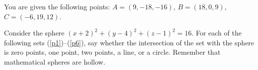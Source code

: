 \documentclass[12pt,addpoints]{exam}
\begin{document}
\begin{questions} 

\question You are given the following points: $A = (9, -18, -16)$, $B = (18, 0, 9)$, $C = (-6, 19, 12)$.




\question Consider the sphere $(x + 2)^2 + (y - 4)^2 + (z - 1)^2 = 16$. For each of the following sets (\ref{p1})--(\ref{p6}), say whether the intersection of the set with the sphere is zero points, one point, two points, a line, or a circle. Remember that mathematical spheres are hollow.


\end{questions} 
\end{document}

